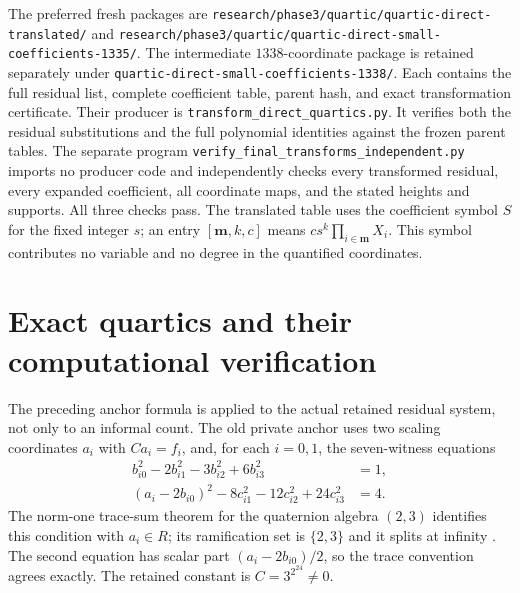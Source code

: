 \documentclass[11pt]{article}
\theoremstyle{definition}
\begin{document}
The preferred fresh packages are
\nolinkurl{research/phase3/quartic/quartic-direct-translated/} and
\nolinkurl{research/phase3/quartic/quartic-direct-small-coefficients-1335/}.
The intermediate $1338$-coordinate package is retained separately
under \nolinkurl{quartic-direct-small-coefficients-1338/}.
Each contains the full residual list, complete coefficient table,
parent hash, and exact transformation certificate.  Their producer
is \nolinkurl{transform_direct_quartics.py}.  It verifies both the
residual substitutions and the full polynomial identities against
the frozen parent tables.  The separate program
\nolinkurl{verify_final_transforms_independent.py} imports no producer
code and independently checks every transformed residual, every
expanded coefficient, all coordinate maps, and the stated heights
and supports.  All three checks pass.  The translated table uses
the coefficient symbol $S$ for the fixed integer $s$; an entry
$[\mathbf m,k,c]$ means $cs^k\prod_{i\in\mathbf m}X_i$.
This symbol contributes no variable and no degree in the quantified
coordinates.


\section{Exact quartics and their computational verification}
\label{sec:quartic-artifacts}

The preceding anchor formula is applied to the actual retained residual
system, not only to an informal count. The old private anchor uses two
scaling coordinates $a_i$ with $Ca_i=f_i$, and, for each $i=0,1$, the
seven-witness equations
\begin{align*}
 b_{i0}^2-2b_{i1}^2-3b_{i2}^2+6b_{i3}^2&=1,\\
 (a_i-2b_{i0})^2-8c_{i1}^2-12c_{i2}^2+24c_{i3}^2&=4.
\end{align*}
The norm-one trace-sum theorem for the quaternion algebra $(2,3)$
identifies this condition with $a_i\in R$; its ramification set is
$\{2,3\}$ and it splits at infinity
\cite[Proposition 6]{Koenigsmann2016}. The second equation has scalar
part $(a_i-2b_{i0})/2$, so the trace convention agrees exactly.
The retained constant is $C=3^{2^{24}}\ne0$.
\end{document}
